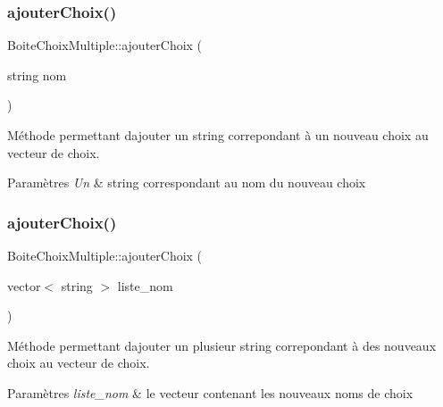 \subsubsection{\texorpdfstring{ajouter\+Choix()}{ajouterChoix()}\hspace{0.1cm}{\footnotesize\ttfamily [1/2]}}
{\footnotesize\ttfamily Boite\+Choix\+Multiple\+::ajouter\+Choix (\begin{DoxyParamCaption}\item[{string}]{nom }\end{DoxyParamCaption})}



Méthode permettant d\textquotesingle{}ajouter un string correpondant à un nouveau choix au vecteur de choix. 


\begin{DoxyParams}{Paramètres}
{\em Un} & string correspondant au nom du nouveau choix \\
\hline
\end{DoxyParams}
\mbox{\label{classBoiteChoixMultiple_a52c59e771b17233ba4e1816907a68284}} 
\subsubsection{\texorpdfstring{ajouter\+Choix()}{ajouterChoix()}\hspace{0.1cm}{\footnotesize\ttfamily [2/2]}}
{\footnotesize\ttfamily Boite\+Choix\+Multiple\+::ajouter\+Choix (\begin{DoxyParamCaption}\item[{vector$<$ string $>$}]{liste\+\_\+nom }\end{DoxyParamCaption})}



Méthode permettant d\textquotesingle{}ajouter un plusieur string correpondant à des nouveaux choix au vecteur de choix. 


\begin{DoxyParams}{Paramètres}
{\em liste\+\_\+nom} & le vecteur contenant les nouveaux noms de choix \\
\hline
\end{DoxyParams}
\mbox{\label{classBoiteChoixMultiple_a3766802fe49f850dbda7a6bdbcb2d5d7}} 
